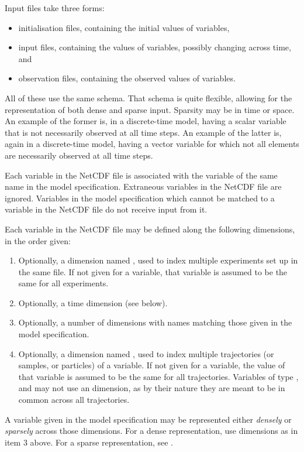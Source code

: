 Input files take three forms:
\begin{itemize}
\item initialisation files, containing the initial values of 
  variables,
\item input files, containing the values of  variables, possibly
  changing across time, and
\item observation files, containing the observed values of 
  variables.
\end{itemize}
All of these use the same schema. That schema is quite flexible, allowing for
the representation of both dense and sparse input. Sparsity may be in time or
space. An example of the former is, in a discrete-time model, having a scalar
 variable that is not necessarily observed at all time steps. An
example of the latter is, again in a discrete-time model, having a vector
 variable for which not all elements are necessarily observed at
all time steps.

Each variable in the NetCDF file is associated with the variable of the same
name in the model specification. Extraneous variables in the NetCDF file are
ignored. Variables in the model specification which cannot be matched to a
variable in the NetCDF file do not receive input from it.

Each variable in the NetCDF file may be defined along the following
dimensions, in the order given:
\begin{enumerate}
\item Optionally, a dimension named , used to index multiple
  experiments set up in the same file. If not given for a variable, that
  variable is assumed to be the same for all experiments.
\item Optionally, a time dimension (see below).
\item Optionally, a number of dimensions with names matching those given in
  the model specification.
\item Optionally, a dimension named , used to index multiple
  trajectories (or samples, or particles) of a variable. If not given for a
  variable, the value of that variable is assumed to be the same for all
  trajectories. Variables of type ,  and 
  may not use an  dimension, as by their nature they are meant to be
  in common across all trajectories.
\end{enumerate}

A variable given in the model specification may be represented either
\emph{densely} or \emph{sparsely} across those dimensions. For a dense
representation, use dimensions as in item 3 above. For a sparse
representation, see .

